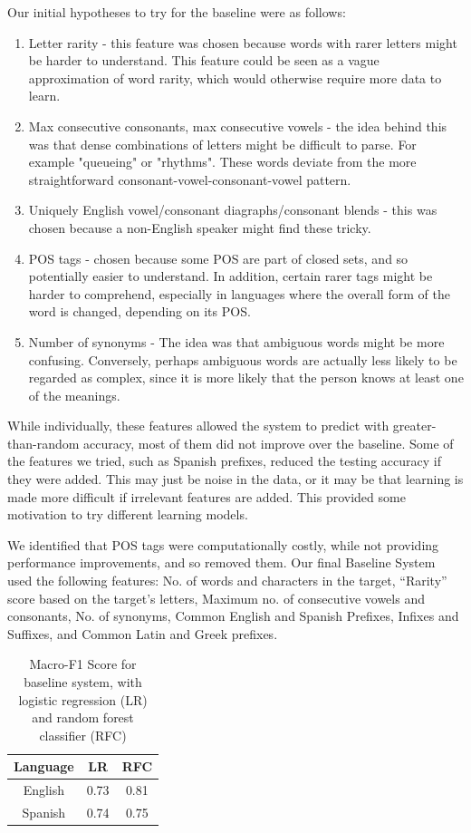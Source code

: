 \documentclass[11pt,a4paper]{article}
\begin{document}
Our initial hypotheses to try for the baseline were as follows:
\begin{enumerate}
\item Letter rarity - this feature was chosen because words with rarer letters might be harder to understand. This feature could be seen as a vague approximation of word rarity, which would otherwise require more data to learn.
\item Max consecutive consonants, max consecutive vowels - the idea behind this was that dense combinations of letters might be difficult to parse. For example "queueing" or "rhythms". These words deviate from the more straightforward consonant-vowel-consonant-vowel pattern.
\item Uniquely English vowel/consonant diagraphs/consonant blends - this was chosen because a non-English speaker might find these tricky.
\item POS tags - chosen because some POS are part of closed sets, and so potentially easier to understand. In addition, certain rarer tags might be harder to comprehend, especially in languages where the overall form of the word is changed, depending on its POS.
\item Number of synonyms - The idea was that ambiguous words might be more confusing. Conversely, perhaps ambiguous words are actually less likely to be regarded as complex, since it is more likely that the person knows at least one of the meanings.
\end{enumerate}

While individually, these features allowed the system to predict with greater-than-random accuracy, most of them did not improve over the baseline. Some of the features we tried, such as Spanish prefixes, reduced the testing accuracy if they were added. This may just be noise in the data, or it may be that learning is made more difficult if irrelevant features are added. This provided some motivation to try different learning models.

We identified that POS tags were computationally costly, while not providing performance improvements, and so removed them. Our final Baseline System used the following features: No. of words and characters in the target, \enquote{Rarity} score based on the target's letters, Maximum no. of consecutive vowels and consonants, No. of synonyms, Common English and Spanish Prefixes, Infixes and Suffixes, and Common Latin and Greek prefixes.

\begin{table}[h]
\begin{center}
\begin{tabular}{|c|c|c|}
\hline
\textbf{Language} & \textbf{LR} & \textbf{RFC} \\
\hline
English & 0.73 & 0.81 \\ \hline
Spanish & 0.74 & 0.75 \\ \hline
\end{tabular}
\caption{Macro-F1 Score for baseline system, with logistic regression (LR) and random forest classifier (RFC)}
\label{tab:baseline}
\end{center}
\end{table}
\end{document}
